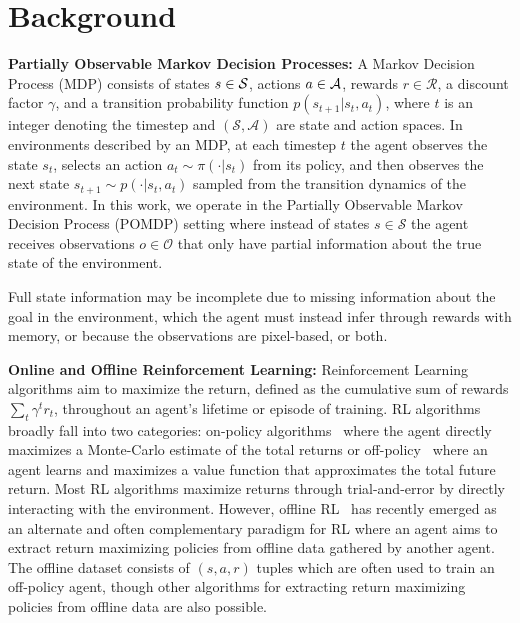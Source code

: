 \section{Background}
\label{sec:background}

{\bf Partially Observable Markov Decision Processes:} A Markov Decision Process (MDP) consists of states $s \in \mathcal S$, actions $a \in \mathcal A$, rewards $r \in \mathcal R$, a discount factor $\gamma$, and a transition probability function $p(s_{t+1}|s_t,a_t)$, where $t$ is an integer denoting the timestep and $(\mathcal S, \mathcal A)$ are state and action spaces. In environments described by an MDP, at each timestep $t$ the agent observes the state $s_t$, selects an action $a_t \sim \pi(\cdot | s_t)$ from its policy, and then observes the next state $s_{t+1} \sim p(\cdot|s_t, a_t)$ sampled from the transition dynamics of the environment. In this work, we operate in the Partially Observable Markov Decision Process (POMDP) setting where instead of states $s \in \mathcal S$ the agent receives observations $o \in \mathcal O$ that only have partial information about the true state of the environment.

Full state information may be incomplete due to missing information about the goal in the environment, which the agent must instead infer through rewards with memory, or because the observations are pixel-based, or both. 


{\bf Online and Offline Reinforcement Learning:} Reinforcement Learning algorithms aim to maximize the return, defined as the cumulative sum of rewards $\sum_t \gamma^t r_t$, throughout an agent's lifetime or episode of training. RL algorithms broadly fall into two categories: on-policy algorithms~\citep{williams92reinforce} where the agent directly maximizes a Monte-Carlo estimate of the total returns or off-policy~\citep{mnih2013dqn, mnih2015human} where an agent learns and maximizes a value function that approximates the total future return. Most RL algorithms maximize returns through trial-and-error by directly interacting with the environment. However, offline RL~\citep{levine2020offline} has recently emerged as an alternate and often complementary paradigm for RL where an agent aims to extract return maximizing policies from offline data gathered by another agent. The offline dataset consists of $(s, a, r)$ tuples which are often used to train an off-policy agent, though other algorithms for extracting return maximizing policies from offline data are also possible.



